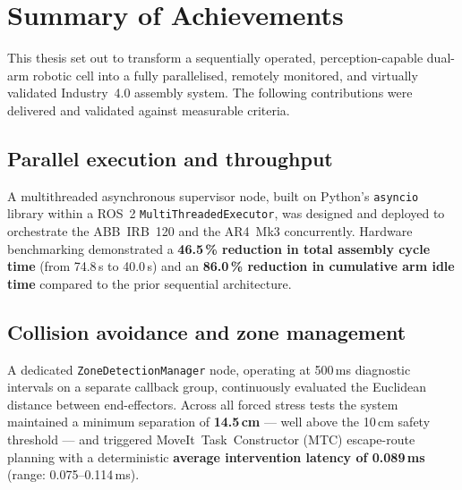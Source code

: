 
\sloppy

\section{Summary of Achievements}
\label{sec:achievements}

This thesis set out to transform a sequentially operated, perception-capable dual-arm
robotic cell into a fully parallelised, remotely monitored, and virtually validated
Industry~4.0 assembly system.  The following contributions were delivered and validated against measurable
criteria.

\subsection{Parallel execution and throughput}
A multithreaded asynchronous supervisor node, built on Python's \texttt{asyncio} library within
a ROS~2 \texttt{MultiThreadedExecutor}, was designed and deployed to orchestrate the ABB~IRB~120
and the AR4~Mk3 concurrently.  Hardware benchmarking demonstrated a \textbf{46.5\,\%
reduction in total assembly cycle time} (from 74.8\,s to 40.0\,s) and an \textbf{86.0\,\%
reduction in cumulative arm idle time} compared to the prior sequential architecture.

\subsection{Collision avoidance and zone management}
A dedicated \texttt{ZoneDetectionManager} node, operating at 500\,ms diagnostic intervals on a
separate callback group, continuously evaluated the Euclidean distance between end-effectors.
Across all forced stress tests the system maintained a minimum separation of \textbf{14.5\,cm}
— well above the 10\,cm safety threshold — and triggered MoveIt~Task~Constructor
(MTC) escape-route planning with a deterministic \textbf{average intervention latency of
0.089\,ms} (range: 0.075--0.114\,ms).


